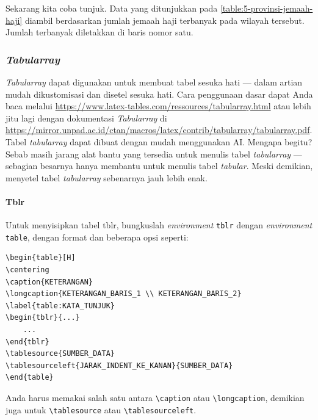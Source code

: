 Sekarang kita coba tunjuk. Data yang ditunjukkan pada \autoref{table:5-provinsi-jemaah-haji} diambil berdasarkan jumlah jemaah haji terbanyak pada wilayah tersebut. Jumlah terbanyak diletakkan di baris nomor satu.

\subsubsection{\textit{Tabularray}}

\textit{Tabularray} dapat digunakan untuk membuat tabel sesuka hati --- dalam artian mudah dikustomisasi dan disetel sesuka hati. Cara penggunaan dasar dapat Anda baca melalui \url{https://www.latex-tables.com/ressources/tabularray.html} atau lebih jitu lagi dengan dokumentasi \textit{Tabularray} di \url{https://mirror.unpad.ac.id/ctan/macros/latex/contrib/tabularray/tabularray.pdf}. Tabel \textit{tabularray} dapat dibuat dengan mudah menggunakan AI. Mengapa begitu? Sebab masih jarang alat bantu yang tersedia untuk menulis tabel \textit{tabularray} --- sebagian besarnya hanya membantu untuk menulis tabel \textit{tabular}. Meski demikian, menyetel tabel \textit{tabularray} sebenarnya jauh lebih enak.

\paragraph{Tblr}
    
Untuk menyisipkan tabel tblr, bungkuslah \textit{environment} \texttt{tblr} dengan \textit{environment} \texttt{table}, dengan format dan beberapa opsi seperti:
\begin{lstlisting}
\begin{table}[H]
\centering
\caption{KETERANGAN}
\longcaption{KETERANGAN_BARIS_1 \\ KETERANGAN_BARIS_2}
\label{table:KATA_TUNJUK}
\begin{tblr}{...}
    ...
\end{tblr}
\tablesource{SUMBER_DATA}
\tablesourceleft{JARAK_INDENT_KE_KANAN}{SUMBER_DATA}
\end{table}
\end{lstlisting}

Anda harus memakai salah satu antara \verb|\caption| atau \verb|\longcaption|, demikian juga untuk \verb|\tablesource| atau \verb|\tablesourceleft|.

